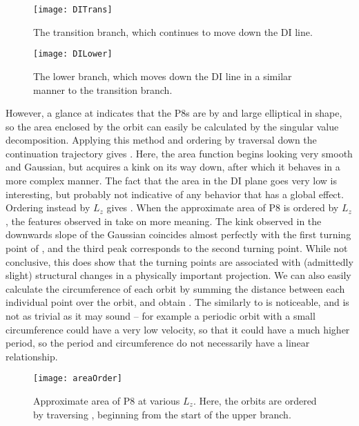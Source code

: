 \begin{figure}[h]
\texttt{[image: DITrans]}
\caption{The transition branch, which continues to move down the DI line.  }\label{fig:DITrans}
\end{figure}

\begin{figure}[h]
\texttt{[image: DILower]}
\caption{The lower branch, which moves down the DI line in a similar manner to the transition branch.}\label{fig:DILower}
\end{figure}

However, a glance at  indicates that the P8s are by and large elliptical in shape, so the area enclosed by the orbit can easily be calculated by the singular value decomposition. Applying this method and ordering by traversal down the continuation trajectory gives . Here, the area function begins looking very smooth and Gaussian, but acquires a kink on its way down, after which it behaves in a more complex manner. The fact that the area in the DI plane goes very low is interesting, but probably not indicative of any behavior that has a global effect. Ordering instead by $L_z$ gives . When the approximate area of P8 is ordered by $L_z$, the features observed in  take on more meaning. The kink observed in the downwards slope of the Gaussian coincides almost perfectly with the first turning point of , and the third peak corresponds to the second turning point. While not conclusive, this does show that the turning points are associated with (admittedly slight) structural changes in a physically important projection.  We can also easily calculate the circumference of each orbit by summing the distance between each individual point over the orbit, and obtain . The similarly to  is noticeable, and is not as trivial as it may sound -- for example a periodic orbit with a small circumference could have a very low velocity, so that it could have a much higher period, so the period and circumference do not necessarily have a linear relationship. \\

\begin{figure}[h!]
\texttt{[image: areaOrder]}
\caption{Approximate area of P8 at various $L_z$. Here, the orbits are ordered by traversing , beginning from the start of the upper branch.}\label{fig:areaOrder}
\end{figure}

